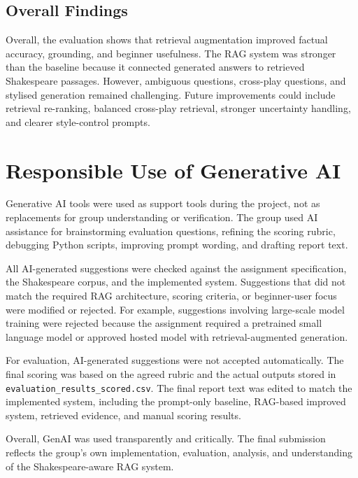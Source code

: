 \documentclass{article}
\begin{document}
\subsection{Overall Findings}

Overall, the evaluation shows that retrieval augmentation improved factual accuracy, grounding, and beginner usefulness. The RAG system was stronger than the baseline because it connected generated answers to retrieved Shakespeare passages. However, ambiguous questions, cross-play questions, and stylised generation remained challenging. Future improvements could include retrieval re-ranking, balanced cross-play retrieval, stronger uncertainty handling, and clearer style-control prompts.

\section{Responsible Use of Generative AI}

Generative AI tools were used as support tools during the project, not as replacements for group understanding or verification. The group used AI assistance for brainstorming evaluation questions, refining the scoring rubric, debugging Python scripts, improving prompt wording, and drafting report text.

All AI-generated suggestions were checked against the assignment specification, the Shakespeare corpus, and the implemented system. Suggestions that did not match the required RAG architecture, scoring criteria, or beginner-user focus were modified or rejected. For example, suggestions involving large-scale model training were rejected because the assignment required a pretrained small language model or approved hosted model with retrieval-augmented generation.


For evaluation, AI-generated suggestions were not accepted automatically. The final scoring was based on the agreed rubric and the actual outputs stored in \texttt{evaluation\_results\_scored.csv}. The final report text was edited to match the implemented system, including the prompt-only baseline, RAG-based improved system, retrieved evidence, and manual scoring results.

Overall, GenAI was used transparently and critically. The final submission reflects the group's own implementation, evaluation, analysis, and understanding of the Shakespeare-aware RAG system.
\end{document}
